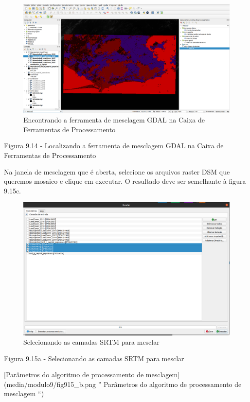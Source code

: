 \documentclass[
]{krantz}
\begin{document}
\begin{figure}
\centering
\includegraphics{media/modulo9/fig914.png}
\caption{Encontrando a ferramenta de mesclagem GDAL na Caixa de Ferramentas de Processamento}
\end{figure}

Figura 9.14 - Localizando a ferramenta de mesclagem GDAL na Caixa de Ferramentas de Processamento

Na janela de mesclagem que é aberta, selecione os arquivos raster DSM que queremos mosaico e clique em executar. O resultado deve ser semelhante à figura 9.15c.

\begin{figure}
\centering
\includegraphics{media/modulo9/fig915_a.png}
\caption{Selecionando as camadas SRTM para mesclar}
\end{figure}

Figura 9.15a - Selecionando as camadas SRTM para mesclar

{[}Parâmetros do algoritmo de processamento de mesclagem{]}(media/modulo9/fig915\_b.png '' Parâmetros do algoritmo de processamento de mesclagem ``)
\end{document}
